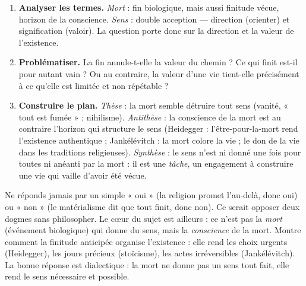 \documentclass[11pt]{article}
\begin{document}
\begin{methode}
\begin{enumerate}
  \item \textbf{Analyser les termes.} \emph{Mort} : fin biologique, mais aussi finitude vécue, horizon de la conscience. \emph{Sens} : double acception — direction (orienter) et signification (valoir). La question porte donc sur la direction et la valeur de l'existence.
  \item \textbf{Problématiser.} La fin annule-t-elle la valeur du chemin ? Ce qui finit est-il pour autant vain ? Ou au contraire, la valeur d'une vie tient-elle précisément à ce qu'elle est limitée et non répétable ?
  \item \textbf{Construire le plan.} \emph{Thèse} : la mort semble détruire tout sens (vanité, « tout est fumée » ; nihilisme). \emph{Antithèse} : la conscience de la mort est au contraire l'horizon qui structure le sens (Heidegger : l'être-pour-la-mort rend l'existence authentique ; Jankélévitch : la mort colore la vie ; le don de la vie dans les traditions religieuses). \emph{Synthèse} : le sens n'est ni donné une fois pour toutes ni anéanti par la mort : il est une \emph{tâche}, un engagement à construire une vie qui vaille d'avoir été vécue.
\end{enumerate}
\end{methode}

\begin{attention}
Ne réponds jamais par un simple « oui » (la religion promet l'au-delà, donc oui) ou « non » (le matérialisme dit que tout finit, donc non). Ce serait opposer deux dogmes sans philosopher. Le cœur du sujet est ailleurs : ce n'est pas la \emph{mort} (événement biologique) qui donne du sens, mais la \emph{conscience} de la mort. Montre comment la finitude anticipée organise l'existence : elle rend les choix urgents (Heidegger), les jours précieux (stoïcisme), les actes irréversibles (Jankélévitch). La bonne réponse est dialectique : la mort ne donne pas un sens tout fait, elle rend le sens nécessaire et possible.
\end{attention}
\end{document}
